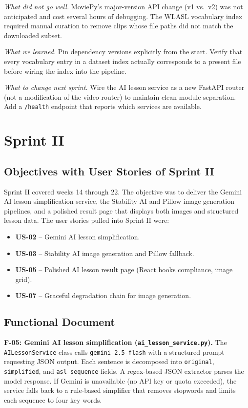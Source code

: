 \documentclass[12pt,a4paper,oneside]{report}
\begin{document}
\textit{What did not go well.} MoviePy's major-version API change (v1 vs.\ v2) was not anticipated and cost several hours of debugging. The WLASL vocabulary index required manual curation to remove clips whose file paths did not match the downloaded subset.

\textit{What we learned.} Pin dependency versions explicitly from the start. Verify that every vocabulary entry in a dataset index actually corresponds to a present file before wiring the index into the pipeline.

\textit{What to change next sprint.} Wire the AI lesson service as a new FastAPI router (not a modification of the video router) to maintain clean module separation. Add a \texttt{/health} endpoint that reports which services are available.

\section{Sprint II}

\subsection{Objectives with User Stories of Sprint II}

Sprint II covered weeks 14 through 22. The objective was to deliver the Gemini AI lesson simplification service, the Stability AI and Pillow image generation pipelines, and a polished result page that displays both images and structured lesson data. The user stories pulled into Sprint II were:

\begin{itemize}[leftmargin=2em,itemsep=0.1em]
  \item \textbf{US-02} -- Gemini AI lesson simplification.
  \item \textbf{US-03} -- Stability AI image generation and Pillow fallback.
  \item \textbf{US-05} -- Polished AI lesson result page (React hooks compliance, image grid).
  \item \textbf{US-07} -- Graceful degradation chain for image generation.
\end{itemize}

\subsection{Functional Document}

\textbf{F-05: Gemini AI lesson simplification (\texttt{ai\_lesson\_service.py}).} The \texttt{AILessonService} class calls \texttt{gemini-2.5-flash} with a structured prompt requesting JSON output. Each sentence is decomposed into \texttt{original}, \texttt{simplified}, and \texttt{asl\_sequence} fields. A regex-based JSON extractor parses the model response. If Gemini is unavailable (no API key or quota exceeded), the service falls back to a rule-based simplifier that removes stopwords and limits each sequence to four key words.
\end{document}
